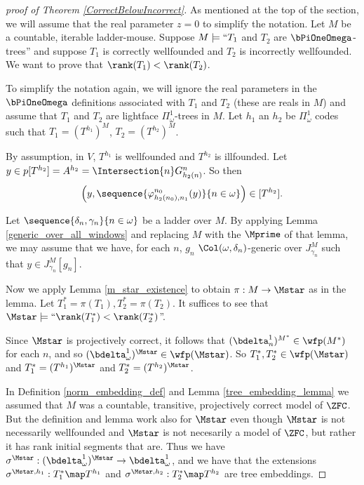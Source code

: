 \documentclass[oneside,12pt]{amsart}
\begin{document}
\begin{proof}[proof of Theorem \ref{CorrectBelowIncorrect}]
As mentioned at the top of the section, we will assume that the real parameter
$z=0$ to simplify the notation.
Let $M$ be a countable, iterable ladder-mouse.
Suppose $M\models ``T_1$ and $T_2$ are $\bPiOneOmega$-trees'' and
suppose $T_1$ is correctly wellfounded and
$T_2$ is incorrectly wellfounded. We want to prove that
$\rank(T_1) < \rank(T_2)$.

To simplify the notation again, we will ignore the real parameters
in the
$\bPiOneOmega$ definitions associated with $T_1$ and $T_2$
(these are reals in $M$)
and assume that
$T_1$ and $T_2$ are lightface $\Pi^1_{\omega}$-trees in $M$.
Let $h_1$ an $h_2$ be $\Pi^1_{\omega}$
codes such that $T_1=(T^{h_1})^M$, $T_2=(T^{h_2})^M$.

By assumption, in $V$, $T^{h_1}$ is wellfounded and $T^{h_2}$ is illfounded. Let
$y\in p[T^{h_2}] = A^{h_2} = \Intersection{n} G^n_{h_2(n)}$.
So then
$$\left(y,\sequence{\varphi^{n_0}_{h_2(n_0),n_1}(y)}{n\in\omega} \right)\in[T^{h_2}].$$

Let $\sequence{\delta_n,\gamma_n}{n\in\omega}$ be a ladder over $M$.
By applying Lemma \ref{generic_over_all_windows} and replacing $M$ with the $\Mprime$ of
that lemma, we may assume that we have, for each $n$, $g_n$
$\Col(\omega,\delta_n)$-generic over $J^M_{\gamma_n}$ such that $y\in J^M_{\gamma_n}[g_n]$.

Now we apply Lemma \ref{m_star_existence} to obtain $\pi:M\to\Mstar$ as in
the lemma.
Let $T_1^* = \pi(T_1), T_2^* = \pi(T_2)$.
It suffices to see that $\Mstar\models\text{``}\rank(T_1^*) < \rank(T_2^*)$''.

Since $\Mstar$ is projectively correct, it follows that $(\bdelta^1_n)^{M^*}\in\wfp(M^*)$
for each $n$, and so $(\bdelta^1_{\omega})^{\Mstar}\in\wfp(\Mstar)$. So
$T_1^*,T_2^*\in\wfp(\Mstar)$ and $T_1^* = (T^{h_1})^{\Mstar}$
and $T_2^* = (T^{h_2})^{\Mstar}$.

In Definition \ref{norm_embedding_def} and
Lemma \ref{tree_embedding_lemma} we assumed that $M$ was a countable, transitive, projectively correct model of $\ZFC$. But the definition and lemma work also for $\Mstar$ even though $\Mstar$ is not
necessarily wellfounded and $\Mstar$ is not necesarily a model of $\ZFC$, but rather it has
rank initial segments that are. Thus we have
$\sigma^{\Mstar}:(\bdelta^1_{\omega})^{\Mstar}\to\bdelta^1_{\omega}$, and
we have that the extensions
$\sigma^{\Mstar,h_1}:T_1^*\map T^{h_1}$ and $\sigma^{\Mstar,h_2}:T_2^*\map T^{h_2}$ are tree
embeddings.


\end{proof}
\end{document}
